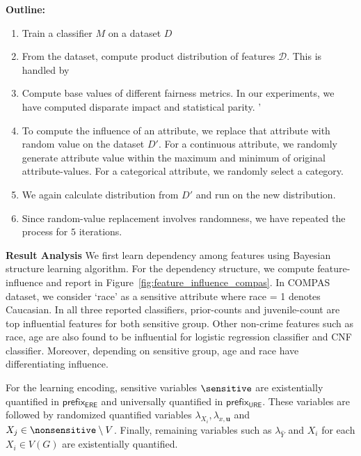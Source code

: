 \begin{enumerate}
	\textbf{Outline:}
	\begin{enumerate}
		\item Train a classifier $ M $ on a dataset $ D $
		\item From the dataset, compute product distribution of features $ \mathcal{D} $. This is handled by {\framework} 
		\item Compute base values of different fairness metrics. In our experiments, we have computed disparate impact and statistical parity. '
		\item To compute the influence of an attribute, we replace that attribute with random value on the dataset $ D' $. For a continuous attribute, we randomly generate attribute value within the maximum and minimum of original attribute-values. For a categorical attribute, we randomly select a category. 
		\item We again calculate distribution from $ D' $ and run {\framework} on the new distribution.
		\item Since random-value replacement involves randomness, we have repeated the process for $ 5 $ iterations. 
	\end{enumerate}
	
	\textbf{Result Analysis}
	We first learn dependency among features using Bayesian structure learning algorithm. For the dependency structure, we compute feature-influence and report in Figure~\ref{fig:feature_influence_compas}. In COMPAS dataset, we consider `race' as a sensitive attribute where race = 1 denotes Caucasian. In all three reported classifiers, prior-counts and juvenile-count are top influential features for both sensitive group. Other non-crime features such as race, age are also found to be influential for logistic regression classifier and CNF classifier. Moreover, depending on sensitive group, age and race have differentiating influence. 
	
\end{enumerate}	



For the learning encoding, sensitive variables $ \sensitive $ are existentially quantified in $ \mathsf{prefix_{ERE}} $ and universally quantified in $ \mathsf{prefix_{URE}} $. These variables are followed by randomized quantified variables $ \lambda_{X_i}, \lambda_{x,\mathbf{u}} $ and $ X_j \in \nonsensitive \setminus V $. Finally, remaining variables such as $ \lambda_{\hat{Y}} $ and $ X_i $ for each $ X_i \in V(G) $ are existentially quantified. 


